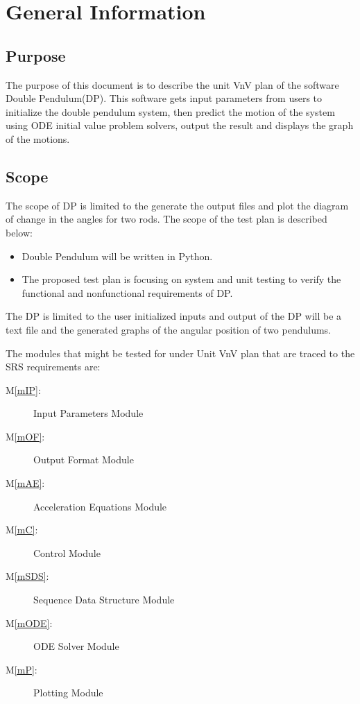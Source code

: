\documentclass[12pt, titlepage]{article}
\newcommand{\mref}[1]{M\ref{#1}}
\begin{document}
\section{General Information}

\subsection{Purpose}
The purpose of this document is to describe the unit VnV plan of the software Double Pendulum(DP). This software gets input parameters from users to initialize the double pendulum system, then predict the motion of the system using ODE initial value problem solvers, output the result and displays the graph of the motions.   

\subsection{Scope}
The scope of DP is limited to the generate the output files and plot the diagram of change in the angles for two rods.
The scope of the test plan is described below:
\begin{itemize}
  \item Double Pendulum will be written in Python.
  \item The proposed test plan is focusing on system and unit testing to verify the functional and nonfunctional requirements of DP. 
\end{itemize}

The DP is limited to the user initialized inputs and output of the DP will be a text file and the generated graphs of the angular position of two pendulums.  

The modules that might be tested for under Unit VnV plan that are traced to the SRS requirements are: 

\begin{description}
\item [\mref{mIP}:] Input Parameters Module
\item [\mref{mOF}:] Output Format Module
\item [\mref{mAE}:] Acceleration Equations Module
\item [\mref{mC}:] Control Module
\item [\mref{mSDS}:] Sequence Data Structure Module
\item [\mref{mODE}:] ODE Solver Module
\item [\mref{mP}:] Plotting Module
 

\end{description}
\end{document}

